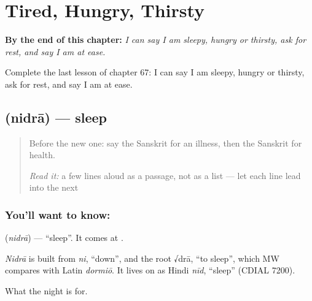 
\chapter{Tired, Hungry, Thirsty}
\label{ch:sa-tired-hungry-thirsty}

\begin{chapteropening}
\textbf{By the end of this chapter:} \emph{I can say I am sleepy, hungry or thirsty, ask for rest, and say I am at ease.}

Complete the last lesson of chapter 67: I can say I am sleepy, hungry or thirsty, ask for rest, and say I am at ease.
\end{chapteropening}

\section[\texorpdfstring{\sk{निद्रा} (nidrā)}{निद्रा (nidrā)}]{ (nidrā) — sleep}

\label{lesson:SA-C67-sleep}



\begin{quote}
Before the new one: say the Sanskrit for an illness, then the Sanskrit for health.

\emph{Read it:} a few lines aloud as a passage, not as a list — let each line lead into the next
\end{quote}

\subsection*{You'll want to know: }
\textbf{} (\emph{nidrā}) — \textquotedblleft{}sleep\textquotedblright{}. It comes at \textbf{}.

\begin{cousinweb}
\emph{Nidrā} is built from \emph{ni}, \textquotedblleft{}down\textquotedblright{}, and the root √drā, \textquotedblleft{}to sleep\textquotedblright{}, which MW compares with Latin \emph{dormiō}. It lives on as Hindi \emph{nīd}, \textquotedblleft{}sleep\textquotedblright{} (CDIAL 7200).
\end{cousinweb}

\begin{grammarlens}[title={What you've built}]
What the night is for.
\end{grammarlens}

